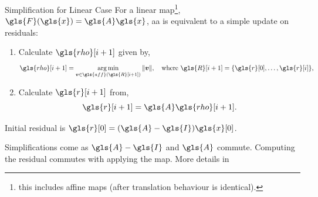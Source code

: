 \documentclass[aspectratio=169]{beamer}
\begin{document}
\begin{frame}{Simplification for Linear Case}
    For a linear map\footnote{this includes affine maps (after translation behaviour is
    identical).}, $\gls{F}(\gls{x}) = \gls{A}\gls{x}$, \gls{aa} is equivalent to a
    simple update on residuals:
    \begin{block}{}
    \begin{enumerate}
        \item Calculate $\gls{rho}[i+1]$ given by,
        \begin{equation}
            \gls{rho}[i+1] = \operatorname*{arg\,min}_{\mathbold{v} \in \gls{aff}(\gls{R}[i+1])}
            \|\mathbold{v}\|, \quad \text{where $\gls{R}[i+1] = \{\gls{r}[0], \dots,
            \gls{r}[i]\}$,}
        \end{equation}
        \item Calculate $\gls{r}[i+1]$ from,
            \begin{equation}
            \gls{r}[i+1] = \gls{A} \gls{rho}[i+1].
            \end{equation}
    \end{enumerate}
    \end{block}
    Initial residual is $\gls{r}[0] = (\gls{A}-\gls{I})\gls{x}[0]$.

    {\footnotesize Simplifications come as $\gls{A}-\gls{I}$ and $\gls{A}$ commute. Computing the
    residual commutes with applying the map. More details in \parencite{Garner2023}}
\end{frame}
\end{document}
